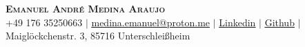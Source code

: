 \begin{center}
    \textbf{\Huge \scshape Emanuel André Medina Araujo} \\ \vspace{1pt}
    \small 
    +49 176 35250663 $|$
    \href{mailto:medina.emanuel@proton.me}{\underline{medina.emanuel@proton.me}} $|$ 
    \href{https://linkedin.com/in/Emanuel-Medina-Araujo}{\underline{Linkedin}} $|$ 
    \href{https://github.com/EmanuelMedinaAraujo}{\underline{Github}} $|$
    Maiglöckchenstr. 3, 85716 Unterschleißheim

\end{center}